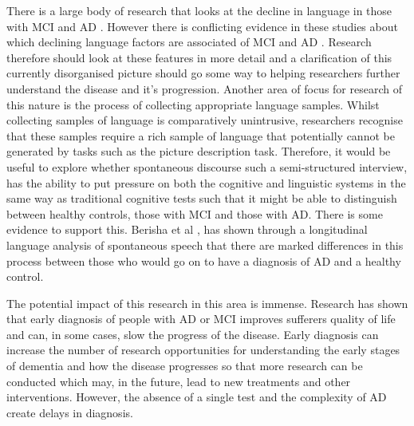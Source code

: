 \documentclass[12pt]{article}
\begin{document}
There is a large body of research that looks at the decline in language in those with MCI and AD \cite{Taler2008, Boschi2017}. However there is conflicting evidence in these studies about which declining language factors are associated of MCI and AD \cite{Taler2008, Boschi2017}. Research therefore should look at these features in more detail and a clarification of this currently disorganised picture should go some way to helping researchers further understand the disease and it's progression. Another area of focus for research of this nature is the process of collecting appropriate language samples. Whilst collecting samples of language is comparatively unintrusive, researchers recognise that these samples require a rich sample of language that potentially cannot be generated by tasks such as the picture description task. Therefore, it would be useful to explore whether spontaneous discourse such a semi-structured interview, has the ability to put pressure on both the cognitive and linguistic systems in the same way as traditional cognitive tests such that it might be able to distinguish between healthy controls, those with MCI and those with AD. There is some evidence to support this. Berisha et al \cite{Berisha2015}, has shown through a longitudinal language analysis of spontaneous speech that there are marked differences in this process between those who would go on to have a diagnosis of AD and a healthy control. 
\par
The potential impact of this research in this area is immense. Research has shown that early diagnosis of people with AD or MCI improves sufferers quality of life and can, in some cases, slow the progress of the disease. Early diagnosis can increase the number of research opportunities for understanding the early stages of dementia and how the disease progresses so that more research can be conducted which may, in the future, lead to new treatments and other interventions.
 However, the absence of a single test and the complexity of AD create delays in diagnosis. 
\end{document}
